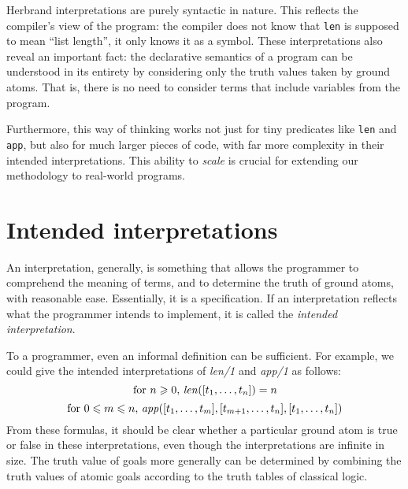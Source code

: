 Herbrand interpretations are purely syntactic in nature.
This reflects the compiler's view of the program:
the compiler does not know that \texttt{len}
is supposed to mean ``list length'',
it only knows it as a symbol.
These interpretations also reveal an important fact:
the declarative semantics of a program
can be understood in its entirety
by considering only the truth values taken by ground atoms.
That is, there is no need to consider terms that include
variables from the program.

Furthermore,
this way of thinking works not just for tiny predicates
like \texttt{len} and \texttt{app},
but also for much larger pieces of code,
with far more complexity in their intended interpretations.
This ability to \emph{scale} is crucial for
extending our methodology to real-world programs.


\section{Intended interpretations}
\label{sec:intended-interp}

An interpretation\label{gi:interpretation}, generally,
is something that allows the programmer
to comprehend the meaning of terms,
and to determine the truth of ground atoms,
with reasonable ease.
Essentially, it is a specification.
If an interpretation reflects what the programmer intends to implement,
it is called the
\emph{intended interpretation\label{gi:intended-interpretation}}.

To a programmer, even an informal definition can be sufficient.
For example, we could give the intended interpretations
of \textit{len/1} and \textit{app/1} as follows:
\[
\text{for } n \geqslant 0, \,\text{\textit{len}}([t_1, \ldots, t_n]) = n
\]
\[
\text{for } 0 \leqslant m \leqslant n,
\,\text{\textit{app}}([t_1, \ldots, t_m], [t_{m+1}, \ldots, t_n], [t_1, \ldots, t_n])
\]
From these formulas,
it should be clear whether a particular ground atom
is true or false in these interpretations,
even though the interpretations are infinite in size.
The truth value of goals more generally
can be determined by combining the truth values of atomic goals
according to the truth tables of classical logic.

